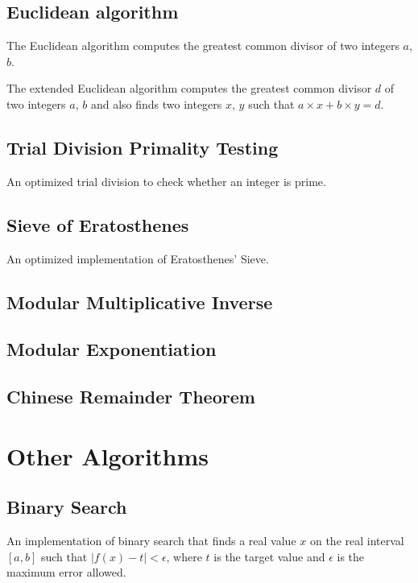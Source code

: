 \documentclass[11pt,a4paper,titlepage]{article}
\begin{document}
			

		\subsection{Euclidean algorithm}
			The Euclidean algorithm computes the greatest common divisor of two integers $a$, $b$.
			

			The extended Euclidean algorithm computes the greatest common divisor $d$ of two integers $a$, $b$ and also finds two integers $x$, $y$ such that $a\times x + b\times y = d$.
			

		\subsection{Trial Division Primality Testing}
			An optimized trial division to check whether an integer is prime.
			

		\subsection{Sieve of Eratosthenes}
			An optimized implementation of Eratosthenes' Sieve.
			

		\subsection{Modular Multiplicative Inverse}
			

		\subsection{Modular Exponentiation}
			

		\subsection{Chinese Remainder Theorem}
			

	\section{Other Algorithms}
		\subsection{Binary Search}
			An implementation of binary search that finds a real value $x$ on the real interval $[a,b]$ such that $|f(x) - t| < \epsilon$, where $t$ is the target value and $\epsilon$ is the maximum error allowed.
			
\end{document}
